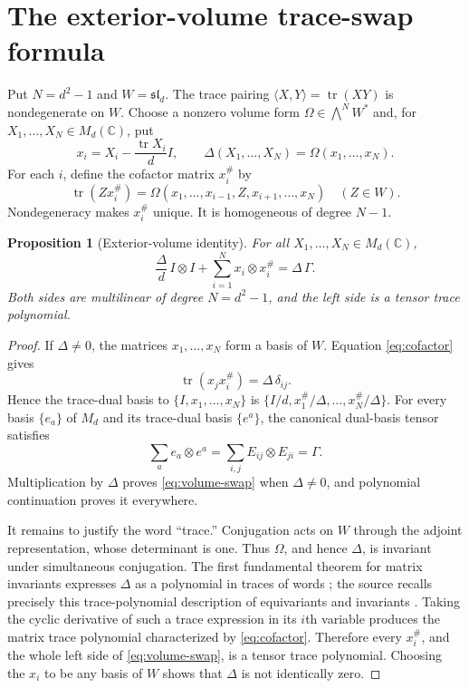 \documentclass[11pt]{article}
\newtheorem{proposition}{Proposition}
\newcommand{\tr}{\operatorname{tr}}
\newcommand{\Id}{I}
\newcommand{\slin}{\mathfrak{sl}_d}
\begin{document}
\section{The exterior-volume trace-swap formula}

Put $N=d^2-1$ and $W=\slin$.  The trace pairing
$\langle X,Y\rangle=\tr(XY)$ is nondegenerate on $W$.  Choose a nonzero
volume form $\Omega\in\bigwedge^N W^*$ and, for
$X_1,\ldots,X_N\in M_d(\mathbb C)$, put
\[
 x_i=X_i-\frac{\tr X_i}{d}\Id,
 \qquad
 \Delta(X_1,\ldots,X_N)=\Omega(x_1,\ldots,x_N).
\]
For each $i$, define the cofactor matrix $x_i^\#$ by
\begin{equation}\label{eq:cofactor}
 \tr(Zx_i^\#)=
 \Omega(x_1,\ldots,x_{i-1},Z,x_{i+1},\ldots,x_N)
 \quad (Z\in W).
\end{equation}
Nondegeneracy makes $x_i^\#$ unique.  It is homogeneous of degree $N-1$.

\begin{proposition}[Exterior-volume identity]\label{prop:volume}
For all $X_1,\ldots,X_N\in M_d(\mathbb C)$,
\begin{equation}\label{eq:volume-swap}
 \boxed{
 \frac{\Delta}{d}\,\Id\otimes\Id+
       \sum_{i=1}^N x_i\otimes x_i^\#
       =\Delta\,\Gamma.}
\end{equation}
Both sides are multilinear of degree $N=d^2-1$, and the left side is a
tensor trace polynomial.
\end{proposition}

\begin{proof}
If $\Delta\ne0$, the matrices $x_1,\ldots,x_N$ form a basis of $W$.
Equation \eqref{eq:cofactor} gives
\[
 \tr(x_jx_i^\#)=\Delta\,\delta_{ij}.
\]
Hence the trace-dual basis to
$\{\Id,x_1,\ldots,x_N\}$ is
$\{\Id/d,x_1^\#/\Delta,\ldots,x_N^\#/\Delta\}$.  For every basis
$\{e_a\}$ of $M_d$ and its trace-dual basis $\{e^a\}$, the canonical
dual-basis tensor satisfies
\[
 \sum_a e_a\otimes e^a
 =\sum_{i,j}E_{ij}\otimes E_{ji}=\Gamma.
\]
Multiplication by $\Delta$ proves \eqref{eq:volume-swap} when
$\Delta\ne0$, and polynomial continuation proves it everywhere.

It remains to justify the word ``trace.''  Conjugation acts on $W$ through
the adjoint representation, whose determinant is one.  Thus $\Omega$, and
hence $\Delta$, is invariant under simultaneous conjugation.  The first
fundamental theorem for matrix invariants expresses $\Delta$ as a polynomial
in traces of words \cite{Procesi1976}; the source recalls precisely this
trace-polynomial description of equivariants and invariants
\cite[Sections II and VI]{Huber2021}.  Taking the cyclic derivative of such
a trace expression in its $i$th variable produces the matrix trace
polynomial characterized by \eqref{eq:cofactor}.  Therefore every
$x_i^\#$, and the whole left side of \eqref{eq:volume-swap}, is a tensor
trace polynomial.  Choosing the $x_i$ to be any basis of $W$ shows that
$\Delta$ is not identically zero.
\end{proof}
\end{document}
